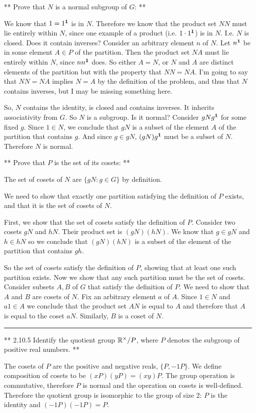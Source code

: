 ** Prove that $N$ is a normal subgroup of $G$: **

We know that $1 = 1^{\mathbf 1}$ is in $N$. Therefore we know that the product set $NN$
must lie entirely within $N$, since one example of a product
(i.e. $1\cdot1^{\mathbf 1}$) is in $N$. I.e. $N$ is closed. Does it contain inverses?
Consider an arbitrary element $n$ of $N$. Let $n^{\mathbf 1}$ be in some element $A \in
P$ of the partition. Then the product set $NA$ must lie entirely within $N$,
since $nn^{\mathbf 1}$ does. So either $A = N$, or $N$ and $A$ are distinct elements of
the partition but with the property that $NN = NA$. I'm going to say that $NN =
NA$ implies $N = A$ by the definition of the problem, and thus that $N$
contains inverses, but I may be missing something here.

So, $N$ contains the identity, is closed and contains inverses. It inherits
associativity from $G$. So $N$ is a subgroup. Is it normal? Consider $gNg^{\mathbf 1}$
for some fixed $g$. Since $1 \in N$, we conclude that $gN$ is a subset of the
element $A$ of the partition that contains $g$. And since $g \in gN$,
$(gN)g^{\mathbf 1}$ must be a subset of $N$. Therefore $N$ is normal.

** Prove that $P$ is the set of its cosets: **

The set of cosets of $N$ are $\{gN: g \in G\}$ by definition.

We need to show that exactly one partition satisfying the definition of $P$
exists, and that it is the set of cosets of $N$.

First, we show that the set of cosets satisfy the definition of $P$. Consider
two cosets $gN$ and $hN$. Their product set is $(gN)(hN)$. We know that $g \in
gN$ and $h \in hN$ so we conclude that $(gN)(hN)$ is a subset of the element of
the partition that contains $gh$.

So the set of cosets satisfy the definition of $P$, showing that at least one
such partition exists. Now we show that any such partition must be the set of
cosets. Consider subsets $A, B$ of $G$ that satisfy the definition of $P$. We
need to show that $A$ and $B$ are cosets of $N$. Fix an arbitrary element $a$
of $A$. Since $1 \in N$ and $a1 \in A$ we conclude that the product set $AN$ is
equal to $A$ and therefore that $A$ is equal to the coset $aN$. Similarly, $B$
is a coset of $N$.

\hrule

** 2.10.5 Identify the quotient group $\mathbb{R}^\times/P$, where $P$ denotes the subgroup of
positive real numbers. **

The cosets of $P$ are the positive and negative reals, $\{P, -1P\}$. We define
composition of cosets to be $(xP)(yP) = (xy)P$. The group operation is
commutative, therefore $P$ is normal and the operation on cosets is
well-defined. Therefore the quotient group is isomorphic to the group of size
2: $P$ is the identity and $(-1P)(-1P) = P$.


